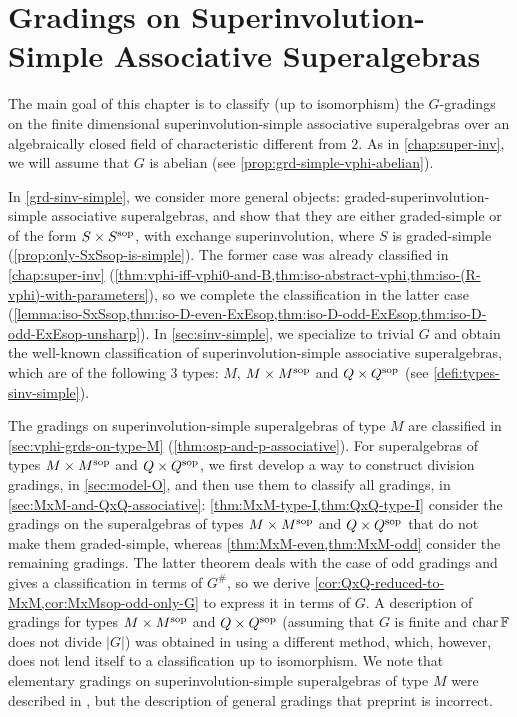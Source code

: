 \chapter[Gradings on Superinvolution-Simple Associative Superalgebras]
{Gradings on Superinvolution-\texorpdfstring{ }{}Simple Associative Superalgebras}\label{chap:grds-sinv-simple}

The main goal of this chapter is to classify (up to isomorphism) the $G$-gradings on the finite dimensional superinvolution-simple associative superalgebras over an algebraically closed field of characteristic different from $2$. 
As in \cref{chap:super-inv}, we will assume that $G$ is abelian (see \cref{prop:grd-simple-vphi-abelian}). 

In \cref{grd-sinv-simple}, we consider more general objects: graded-superinvolution-simple associative superalgebras, and show that they are either graded-simple or of the form $S\times S^{\mathrm{sop}}$, with exchange superinvolution, where $S$ is graded-simple (\cref{prop:only-SxSsop-is-simple}). 
The former case was already classified in \cref{chap:super-inv} (\cref{thm:vphi-iff-vphi0-and-B,thm:iso-abstract-vphi,thm:iso-(R-vphi)-with-parameters}), so we complete the classification in the latter case (\cref{lemma:iso-SxSsop,thm:iso-D-even-ExEsop,thm:iso-D-odd-ExEsop,thm:iso-D-odd-ExEsop-unsharp}). 
In \cref{sec:sinv-simple}, we specialize to trivial $G$ and obtain the well-known classification of superinvolution-simple associative superalgebras, which are of the following $3$ types: $M$, $M\times M^{\mathrm{sop}}$ and $Q\times Q^{\mathrm{sop}}$ (see \cref{defi:types-sinv-simple}). 

The gradings on superinvolution-simple superalgebras of type $M$ are classified in \cref{sec:vphi-grds-on-type-M} (\cref{thm:osp-and-p-associative}). 
For superalgebras of types $M\times M^{\mathrm{sop}}$ and $Q\times Q^{\mathrm{sop}}$, we first develop a way to construct division gradings, in \cref{sec:model-O}, and then use them to classify all gradings, in \cref{sec:MxM-and-QxQ-associative}: 
\cref{thm:MxM-type-I,thm:QxQ-type-I} consider the gradings on the superalgebras of types $M\times M^{\mathrm{sop}}$ and $Q\times Q^{\mathrm{sop}}$ that do not make them graded-simple, whereas  
\cref{thm:MxM-even,thm:MxM-odd} consider the remaining gradings. 
The latter theorem deals with the case of odd gradings and gives a classification in terms of $G^\#$, so we derive
\cref{cor:QxQ-reduced-to-MxM,cor:MxMsop-odd-only-G} to express it in terms of $G$. 
A description of gradings for types $M\times M^{\mathrm{sop}}$ and $Q\times Q^{\mathrm{sop}}$ (assuming that $G$ is finite and $\operatorname{char} \mathbb{F}$ does not divide $|G|$) was obtained in \cite[Theorems 4 and 5]{BTT} using a different method, which, however, does not lend itself to a classification up to isomorphism. 
We note that elementary gradings on superinvolution-simple superalgebras of type $M$ were described in \cite[Theorems 5.2 and 5.3]{TT}, but the description of general gradings that preprint is incorrect.  

